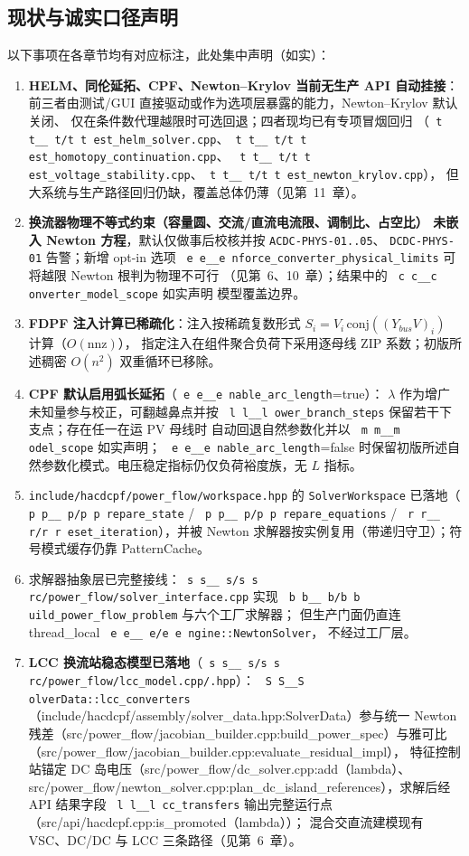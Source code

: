 \documentclass[UTF8,fontset=fandol,a4paper,11pt]{ctexart}
\makeatletter
\newcommand{\fld}[1]{\texttt{\fld@scan#1\fld@stop}}
\def\fld@scan#1{%
  \ifx#1\fld@stop
  \else
    \ifx#1\_\_\allowbreak\else#1\fi
    \expandafter\fld@scan
  \fi}
\newcommand{\srcpath}[1]{\texttt{\src@scan#1\src@stop}}
\def\src@scan#1{%
  \ifx#1\src@stop
  \else
    \ifx#1\_\_\allowbreak\else
    \ifx#1/#1\allowbreak\else
    #1\fi\fi
    \expandafter\src@scan
  \fi}
\makeatother
\begin{document}
\subsection{现状与诚实口径声明}
以下事项在各章节均有对应标注，此处集中声明（如实）：
\begin{enumerate}
  \item \textbf{HELM、同伦延拓、CPF、Newton--Krylov 当前无生产 API 自动挂接}：
        前三者由测试/GUI 直接驱动或作为选项层暴露的能力，Newton--Krylov 默认关闭、
        仅在条件数代理越限时可选回退；四者现均已有专项冒烟回归
        （\srcpath{test\_helm\_solver.cpp}、\srcpath{test\_homotopy\_continuation.cpp}、
        \srcpath{test\_voltage\_stability.cpp}、\srcpath{test\_newton\_krylov.cpp}），
        但大系统与生产路径回归仍缺，覆盖总体仍薄（见第~11~章）。
  \item \textbf{换流器物理不等式约束（容量圆、交流/直流电流限、调制比、占空比）
        未嵌入 Newton 方程}，默认仅做事后校核并按 \texttt{ACDC-PHYS-01..05}、
        \texttt{DCDC-PHYS-01} 告警；新增 opt-in 选项
        \fld{enforce\_converter\_physical\_limits} 可将越限 Newton 根判为物理不可行
        （见第~6、10~章）；结果中的 \fld{converter\_model\_scope} 如实声明
        模型覆盖边界。
  \item \textbf{FDPF 注入计算已稀疏化}：注入按稀疏复数形式
        $S_i=V_i\,\mathrm{conj}((Y_{bus}V)_i)$ 计算（$O(\mathrm{nnz})$），
        指定注入在组件聚合负荷下采用逐母线 ZIP 系数；初版所述稠密 $O(n^2)$
        双重循环已移除。
  \item \textbf{CPF 默认启用弧长延拓}（\fld{enable\_arc\_length}=true）：
        $\lambda$ 作为增广未知量参与校正，可翻越鼻点并按
        \fld{lower\_branch\_steps} 保留若干下支点；存在任一在运 PV 母线时
        自动回退自然参数化并以 \fld{model\_scope} 如实声明；
        \fld{enable\_arc\_length}=false
        时保留初版所述自然参数化模式。电压稳定指标仍仅负荷裕度族，无 $L$ 指标。
  \item \texttt{include/hacdcpf/power\_flow/workspace.hpp} 的
        \texttt{SolverWorkspace} 已落地（\srcpath{prepare\_state} /
        \srcpath{prepare\_equations} / \srcpath{reset\_iteration}），并被
        Newton 求解器按实例复用（带递归守卫）；符号模式缓存仍靠 PatternCache。
  \item 求解器抽象层已完整接线：\srcpath{src/power\_flow/solver\_interface.cpp}
        实现 \srcpath{build\_power\_flow\_problem} 与六个工厂求解器；
        但生产门面仍直连 thread\_local \srcpath{engine::NewtonSolver}，
        不经过工厂层。
  \item \textbf{LCC 换流站稳态模型已落地}（\srcpath{src/power\_flow/lcc\_model.cpp/.hpp}）：
        \fld{SolverData::lcc\_converters}（include/hacdcpf/assembly/solver\_data.hpp:SolverData）参与统一 Newton
        残差（src/power\_flow/jacobian\_builder.cpp:build\_power\_spec）与雅可比（src/power\_flow/jacobian\_builder.cpp:evaluate\_residual\_impl），
        特征控制站锚定 DC 岛电压（src/power\_flow/dc\_solver.cpp:add（lambda）、
        src/power\_flow/newton\_solver.cpp:plan\_dc\_island\_references），求解后经 API 结果字段
        \fld{lcc\_transfers} 输出完整运行点（src/api/hacdcpf.cpp:is\_promoted（lambda））；
        混合交直流建模现有 VSC、DC/DC 与 LCC 三条路径（见第~6~章）。
\end{enumerate}
\end{document}
